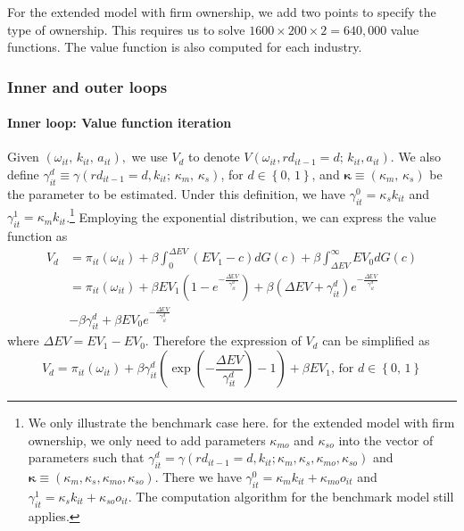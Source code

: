 \documentclass[11pt]{article}
\begin{document}
For the extended model with firm ownership, we add two points to specify the type of ownership. This requires us to solve $1600\times 200 \times 2 = 640,000$ value functions. The value function is also computed for each industry. 
\subsubsection{Inner and outer loops}
\paragraph{Inner loop: Value function iteration}

Given $\left(\omega_{it},\,k_{it},\,a_{it}\right),$ we use $V_{d}$
to denote $V\left(\omega_{it},rd_{it-1}=d;\,k_{it},a_{it}\right)$.
We also define $\gamma_{it}^{d}\equiv\gamma\left(rd_{it-1}=d,k_{it};\,\kappa_{m},\,\kappa_{s}\right)$,
for $d\in\left\{ 0,\,1\right\} $, and $\boldsymbol{\kappa}\equiv\left(\kappa_{m},\,\kappa_{s}\right)$
be the parameter to be estimated. Under this definition, we have  $\gamma_{it}^0=\kappa_s k_{it}$ and $\gamma_{it}^1=\kappa_m k_{it}$.\footnote{We only illustrate the benchmark case here. for the extended model with firm ownership, we only need to add parameters $\kappa_{mo}$ and $\kappa_{so}$ into the vector of parameters such that $\gamma_{it}^{d}=\gamma(rd_{it-1}=d, k_{it}; \kappa_m, \kappa_s, \kappa_{mo}, \kappa_{so})$ and $\boldsymbol{\kappa}\equiv(\kappa_m, \kappa_s, \kappa_{mo}, \kappa_{so})$. There we have $\gamma_{it}^0=\kappa_mk_{it}+\kappa_{mo}o_{it}$ and $\gamma_{it}^1=\kappa_sk_{it}+\kappa_{so}o_{it}$. The computation algorithm for the benchmark model still applies.} Employing the exponential distribution,
we can express the value function as 
\begin{align*}
V_{d} & =\pi_{it}\left(\omega_{it}\right)+\beta\int_{0}^{\Delta EV}\left(EV_{1}-c\right)dG\left(c\right)+\beta\int_{\Delta EV}^{\infty}EV{}_{0}dG\left(c\right)\\
 & =\pi_{it}\left(\omega_{it}\right)+\beta EV_{1}\left(1-e^{-\frac{\Delta\mathbb{E}V}{\gamma_{it}^{d}}}\right)+\beta\left(\Delta EV+\gamma_{it}^{d}\right)e^{-\frac{\Delta\mathbb{E}V}{\gamma_{it}^{d}}}\\
 & -\beta\gamma_{it}^{d}+\beta EV{}_{0}e^{-\frac{\Delta\mathbb{E}V}{\gamma_{it}^{d}}}
\end{align*}
where $\Delta EV=EV_{1}-EV_{0}$. Therefore the expression of $V_{d}$
can be simplified as 
\begin{equation}
V_{d}=\pi_{it}\left(\omega_{it}\right)+\beta\gamma_{it}^{d}\left(\exp\left(-\frac{\Delta EV}{\gamma_{it}^{d}}\right)-1\right)+\beta EV_{1},\,\text{for }d\in\left\{ 0,\,1\right\} \label{Vd}
\end{equation}
\end{document}
